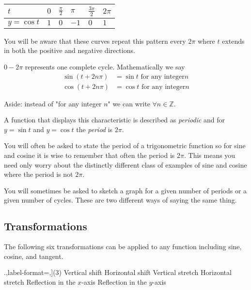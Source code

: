 \begin{tabular}[c]{|l|l|l|l|l|l|}\hline
	$t$  & $0$  & $\frac{\pi }{2}$  & $\pi $  & $\frac{3 \pi }{2}$  & $2 \pi $  \\
	\hline
	$y =\cos  t$  & $1$  & $0$  & $ -1$  & $0$  & $1$  \\
	\hline
\end{tabular}

You will be aware that these curves repeat this pattern every $2 \pi $ where $t$ extends in both the positive and negative directions. 

$0 -2 \pi $ represents one complete cycle. Mathematically we say
\begin{align*}\sin  \left (t +2 n \pi \right ) &  = \sin  t\text{\  for any integer}n \\
	\cos  \left (t +2 n \pi \right ) &  = \cos  t\text{\  for any integer}n\end{align*}

Aside: instead of "for any integer $n$" we can write $ \forall n \in \mathbb{Z}$. 

A function that displays this characteristic is described as \emph{periodic} and for $y =\sin  t$ and $y =\cos  t$ the \emph{period} is $2 \pi $. 

You will often be asked to state the period of a trigonometric function so for sine and cosine it
is wise to remember that often the period is $2 \pi $. This means you need only worry about the distinctly different class of examples
of sine and cosine where the period is not $2 \pi $. 

You will sometimes be asked to sketch a graph for a given number of periods or a given number of cycles. These are two different ways of saying the same thing. 

\subsection{Transformations}
The following six transformations can be applied to any function including sine, cosine, and tangent. 
\begin{tasks}[counter-format=tsk[1].,label-format={},](3)
\task Vertical shift 
\task Horizontal shift 
\task Vertical stretch 
\task Horizontal stretch 
\task Reflection in the $x$-axis 
\task Reflection in the $y$-axis 
\end{tasks}

